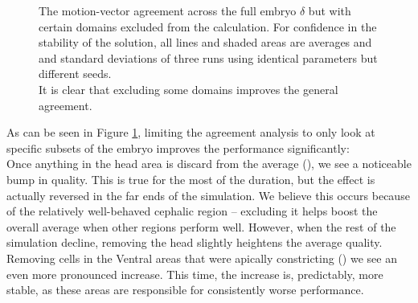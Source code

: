 \begin{figure}[H]
    \centering
    \caption{The motion-vector agreement across the full embryo $\delta$ but with certain domains excluded from the calculation. For confidence in the stability of the solution, all lines and shaded areas are averages and and standard deviations of three runs using identical parameters but different seeds.\\It is clear that excluding some domains improves the general agreement.}
    \label{fig:vector-subsets}
\end{figure}

As can be seen in Figure \ref{fig:vector-subsets}, limiting the agreement analysis to only look at specific subsets of the embryo improves the performance significantly:\\

Once anything in the head area is discard from the average (), we see a noticeable bump in quality. This is true for the most of the duration, but the effect is actually reversed in the far ends of the simulation. We believe this occurs because of the relatively well-behaved cephalic region --  excluding it helps boost the overall average when other regions perform well. However, when the rest of the simulation decline, removing the head slightly heightens the average quality. \\

Removing cells in the Ventral areas that were apically constricting () we see an even more pronounced increase. This time, the increase is, predictably, more stable, as these areas are responsible for consistently worse performance. \\


